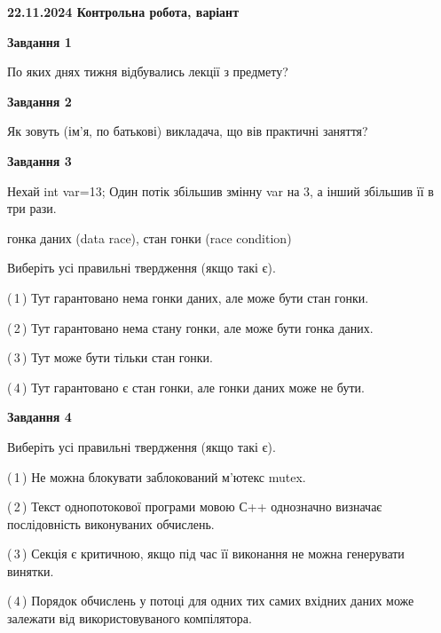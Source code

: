 \documentclass[12pt, ukrainian]{article}
\begin{document}
\begin {large}

\textbf{22.11.2024 Контрольна робота, варіант  }\par


{

\begin{center}
\textbf{Завдання 1}
\end{center}

По яких днях тижня відбувались лекції з предмету?


\begin{center}
\textbf{Завдання 2}
\end{center}

Як зовуть (ім'я, по батькові) викладача, що вів практичні заняття?


\begin{center}
\textbf{Завдання 3}
\end{center}

Нехай int var=13; Один потік збільшив змінну var на 3, а інший збільшив її в три рази.

гонка даних (data race), стан гонки (race condition)

Виберіть усі правильні твердження (якщо такі є).\par
\vspace{2mm}
(\,1\,) Тут гарантовано нема гонки даних, але може бути стан гонки.%

(\,2\,) Тут гарантовано нема стану гонки, але може бути гонка даних.%

(\,3\,) Тут може бути тільки стан гонки.%

(\,4\,) Тут гарантовано є стан гонки, але гонки даних може не бути.%


\begin{center}
\textbf{Завдання 4}
\end{center}

Виберіть усі правильні твердження (якщо такі є).\par
\vspace{2mm}

(\,1\,) Не можна блокувати заблокований м’ютекс mutex.%

(\,2\,) Текст однопотокової програми мовою С++ однозначно визначає послідовність виконуваних обчислень.%

(\,3\,) Секція є критичною, якщо під час її виконання не можна генерувати винятки.%

(\,4\,) Порядок обчислень у потоці для одних тих самих вхідних даних може залежати від використовуваного компілятора.%


}
\end{large}
\end{document}
